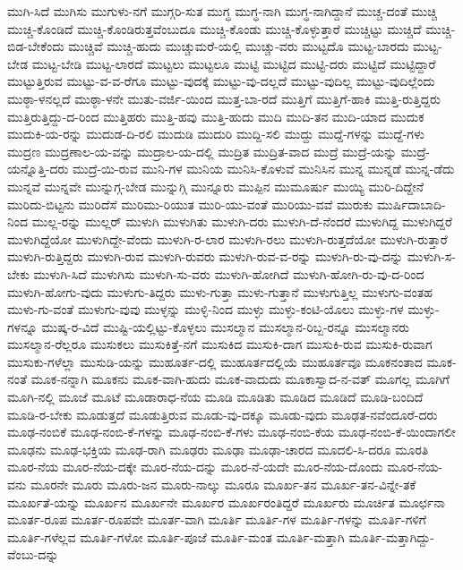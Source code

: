 {ಮುಗಿ-ಸಿದೆ
ಮುಗಿಸು
ಮುಗುಳು-ನಗೆ
ಮುಗ್ಗರಿ-ಸುತ
ಮುಗ್ಧ
ಮುಗ್ಧ-ನಾಗಿ
ಮುಗ್ಧ-ನಾಗಿದ್ದಾನೆ
ಮುಚ್ಚ-ದಂತೆ
ಮುಚ್ಚಿ
ಮುಚ್ಚಿ-ಕೊಂಡಿದೆ
ಮುಚ್ಚಿ-ಕೊಂಡಿರುತ್ತವೆಂಬುದೂ
ಮುಚ್ಚಿ-ಕೊಂಡು
ಮುಚ್ಚಿ-ಕೊಳ್ಳುತ್ತಾರೆ
ಮುಚ್ಚಿಟ್ಟು
ಮುಚ್ಚಿದೆ
ಮುಚ್ಚಿ-ಬಿಡ-ಬೇಕೆಂದು
ಮುಚ್ಚಿವೆ
ಮುಚ್ಚಿ-ಹುದು
ಮುಚ್ಚುಮರೆ-ಯಲ್ಲಿ
ಮುಚ್ಚು-ವರು
ಮುಟ್ಟದೊ
ಮುಟ್ಟ-ಬಾರದು
ಮುಟ್ಟ-ಬೇಡ
ಮುಟ್ಟ-ಬೇಡಿ
ಮುಟ್ಟ-ಲಾರದೆ
ಮುಟ್ಟಲು
ಮುಟ್ಟಲೂ
ಮುಟ್ಟಿ
ಮುಟ್ಟಿದ
ಮುಟ್ಟಿ-ದರು
ಮುಟ್ಟಿದೆ
ಮುಟ್ಟಿದ್ದಾರೆ
ಮುಟ್ಟುತ್ತಿರುವ
ಮುಟ್ಟು-ವ-ವ-ರೆಗೂ
ಮುಟ್ಟು-ವುದಕ್ಕೆ
ಮುಟ್ಟು-ವು-ದಲ್ಲದೆ
ಮುಟ್ಟು-ವುದಿಲ್ಲ
ಮುಟ್ಟು-ವುದಿಲ್ಲೆಂದು
ಮುಠ್ಠಾ-ಳನಲ್ಲದೆ
ಮುಠ್ಠಾ-ಳನೇ
ಮುತು-ವರ್ಜಿ-ಯಿಂದ
ಮುತ್ತ-ಬಾ-ರದೆ
ಮುತ್ತಿಗೆ
ಮುತ್ತಿಗೆ-ಹಾಕಿ
ಮುತ್ತಿ-ರುತ್ತಿದ್ದರು
ಮುತ್ತಿರುತ್ತಿದ್ದು-ದ-ರಿಂದ
ಮುತ್ತಿಹರು
ಮುತ್ತಿ-ಹವು
ಮುತ್ತಿ-ಹುದು
ಮುದಿ
ಮುದಿ-ತನ
ಮುದಿ-ಯಾದ
ಮುದುಕ
ಮುದುಕಿ-ಯ-ರನ್ನು
ಮುದುಡ-ದಿ-ರಲಿ
ಮುದುಡಿ
ಮುದುರಿ
ಮುದ್ದಿ-ಸಲಿ
ಮುದ್ದು
ಮುದ್ದೆ-ಗಳನ್ನು
ಮುದ್ದೆ-ಗಳು
ಮುದ್ರಣ
ಮುದ್ರಣಾಲ-ಯ-ವನ್ನು
ಮುದ್ರಾಲ-ಯ-ದಲ್ಲಿ
ಮುದ್ರಿತ
ಮುದ್ರಿತ-ವಾದ
ಮುದ್ರೆ
ಮುದ್ರೆ-ಯನ್ನು
ಮುದ್ರೆ-ಯನ್ನೊತ್ತಿ-ದರು
ಮುದ್ರೆ-ಯಿ-ರುವ
ಮುನಿ-ಗಳ
ಮುನಿಯ
ಮುನಿಸಿ-ಕೊಳುವೆ
ಮುನಿಸಿನ
ಮುನ್ನ
ಮುನ್ನಡೆ
ಮುನ್ನ-ಡೆದು
ಮುನ್ನವೆ
ಮುನ್ನವೇ
ಮುನ್ನುಗ್ಗ-ಬೇಡ
ಮುನ್ನುಗ್ಗಿ
ಮುನ್ನೂರು
ಮುಪ್ಪಿನ
ಮುಮೂರ್ಷು
ಮುಯ್ಯಿ
ಮುರಿ-ದಿದ್ದೇನೆ
ಮುರಿದು-ಬಿಟ್ಟನು
ಮುರಿದೆಸೆ
ಮುರಿಮು-ರಿಯುತ
ಮುರಿ-ಯು-ವಂತೆ
ಮುರಿಯು-ವವೆ
ಮುರುಕು
ಮುರ್ಷಿದಾಬಾದಿ-ನಿಂದ
ಮುಲ್ಲ-ರನ್ನು
ಮುಲ್ಲರ್
ಮುಳುಗಿ
ಮುಳುಗಿತು
ಮುಳುಗಿ-ದರು
ಮುಳುಗಿ-ದೆ-ನೆಂದರೆ
ಮುಳುಗಿದ್ದ
ಮುಳುಗಿದ್ದರೆ
ಮುಳುಗಿದ್ದೆಯೋ
ಮುಳುಗಿದ್ದೇ-ವೆಂದು
ಮುಳುಗಿ-ರ-ಲಾರ
ಮುಳುಗಿ-ರಲು
ಮುಳುಗಿ-ರುತ್ತದೆಯೋ
ಮುಳುಗಿ-ರುತ್ತಾರೆ
ಮುಳುಗಿ-ರುತ್ತಿದ್ದರು
ಮುಳುಗಿ-ರುವ
ಮುಳುಗಿ-ರುವರು
ಮುಳುಗಿ-ರುವ-ವ-ರನ್ನು
ಮುಳುಗಿ-ರು-ವು-ದನ್ನು
ಮುಳುಗಿ-ಸ-ಬೇಕು
ಮುಳುಗಿ-ಸಿದೆ
ಮುಳುಗಿಸು
ಮುಳುಗಿ-ಸು-ವರು
ಮುಳುಗಿ-ಹೋಗಿದೆ
ಮುಳುಗಿ-ಹೋಗಿ-ರು-ವು-ದ-ರಿಂದ
ಮುಳುಗಿ-ಹೋಗು-ವುದು
ಮುಳುಗು-ತಿದ್ದರು
ಮುಳು-ಗುತ್ತಾ
ಮುಳು-ಗುತ್ತಾನೆ
ಮುಳುಗುತ್ತಿಲ್ಲ
ಮುಳುಗು-ವಂತಹ
ಮುಳು-ಗು-ವಂತೆ
ಮುಳುಗು-ವುವು
ಮುಳ್ಳನ್ನು
ಮುಳ್ಳಿ-ನಿಂದ
ಮುಳ್ಳು
ಮುಳ್ಳು-ಕಂಟಿ-ಯೊಲು
ಮುಳ್ಳು-ಗಳ
ಮುಳ್ಳು-ಗಳನ್ನೂ
ಮುಷ್ಕ-ರ-ವಿದೆ
ಮುಷ್ಟಿ-ಯಲ್ಲಿಟ್ಟು-ಕೊಳ್ಳಲು
ಮುಸಲ್ಮಾನ
ಮುಸಲ್ಮಾನ-ರಿಬ್ಬ-ರನ್ನೂ
ಮುಸಲ್ಮಾನರು
ಮುಸಲ್ಮಾನ-ರೆಲ್ಲರೂ
ಮುಸುಕಲು
ಮುಸುಕಿತ್ತೆ-ನಗೆ
ಮುಸುಕಿದ
ಮುಸುಕಿ-ದಾಗ
ಮುಸುಕಿ-ರುವ
ಮುಸುಕಿ-ರುವಾಗ
ಮುಸುಕು-ಗಳೆಲ್ಲಾ
ಮುಸುಡಿ-ಯನ್ನು
ಮುಹೂರ್ತ-ದಲ್ಲಿ
ಮುಹೂರ್ತದಲ್ಲಿಯೆ
ಮುಹೂರ್ತವೂ
ಮೂಕನಂತಾದ
ಮೂಕ-ನಂತೆ
ಮೂಕ-ನನ್ನಾಗಿ
ಮೂಕನು
ಮೂಕ-ವಾಗಿ-ಹುದು
ಮೂಕ-ವಾದುದು
ಮೂಕಾಸ್ವಾದ-ನ-ವತ್
ಮೂಗಲ್ಲ
ಮೂಗಿಗೆ
ಮೂಗಿ-ನಲ್ಲಿ
ಮೂಜೆ
ಮೂಟೆ
ಮೂಡಾರಾಧ-ನೆಯ
ಮೂಡಿ
ಮೂಡಿತು
ಮೂಡಿದ
ಮೂಡಿದೆ
ಮೂಡಿ-ಬಂದಿದೆ
ಮೂಡಿ-ರ-ಬೇಕು
ಮೂಡುತ್ತದೆ
ಮೂಡುತ್ತಿರುವ
ಮೂಡು-ವು-ದಕ್ಕೂ
ಮೂಡು-ವುದು
ಮೂಢತ-ನವೆಂದೂರೆ-ದರು
ಮೂಢ-ನಂಬಿಕೆ
ಮೂಢ-ನಂಬಿ-ಕೆ-ಗಳನ್ನು
ಮೂಢ-ನಂಬಿ-ಕೆ-ಗಳು
ಮೂಢ-ನಂಬಿ-ಕೆಯ
ಮೂಢ-ನಂಬಿ-ಕೆ-ಯಿಂದಾಗಲೀ
ಮೂಢನು
ಮೂಢ-ಭಕ್ತಿಯ
ಮೂಢ-ರಾಗಿ
ಮೂಢರು
ಮೂಢಾ
ಮೂಢಾ-ಚಾರದ
ಮೂದಲಿ-ಸಿ-ದರೂ
ಮೂರತಿ
ಮೂರ-ನೆಯ
ಮೂರ-ನೆಯ-ದಕ್ಕೇ
ಮೂರ-ನೆಯ-ದನ್ನು
ಮೂರ-ನೆ-ಯದೇ
ಮೂರ-ನೆಯ-ದೊಂದು
ಮೂರ-ನೆಯ-ವನು
ಮೂರನೇ
ಮೂರು
ಮೂರು-ಜನ
ಮೂರು-ನಾಲ್ಕು
ಮೂರೂ
ಮೂರ್ಖ-ತನ
ಮೂರ್ಖ-ತನ-ವಿನ್ನೇ-ತಕೆ
ಮೂರ್ಖತೆ-ಯನ್ನು
ಮೂರ್ಖನ
ಮೂರ್ಖನೇ
ಮೂರ್ಖರ
ಮೂರ್ಖರಂತಿದ್ದರೆ
ಮೂರ್ಖರು
ಮೂರ್ಚಿತ
ಮೂರ್ಛನಾ
ಮೂರ್ತ-ರೂಪ
ಮೂರ್ತ-ರೂಪವೇ
ಮೂರ್ತ-ವಾಗಿ
ಮೂರ್ತಿ
ಮೂರ್ತಿ-ಗಳ
ಮೂರ್ತಿ-ಗಳನ್ನು
ಮೂರ್ತಿ-ಗಳಿಗೆ
ಮೂರ್ತಿ-ಗಳೆಲ್ಲವ
ಮೂರ್ತಿ-ಗಳೋ
ಮೂರ್ತಿ-ಪೂಜೆ
ಮೂರ್ತಿ-ಮಂತ
ಮೂರ್ತಿ-ಮತ್ತಾಗಿ
ಮೂರ್ತಿ-ಮತ್ತಾಗಿದ್ದು-ವೆಂಬು-ದನ್ನು
}
